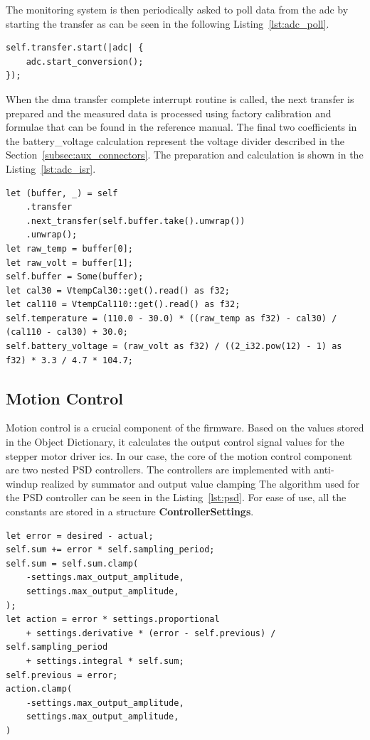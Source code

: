 The monitoring system is then periodically asked to poll data from the \acs{adc} by starting the transfer as can be seen in the following Listing~\ref{lst:adc_poll}.
\begin{lstlisting}[caption={Polling the ADC.},label=lst:adc_poll]
self.transfer.start(|adc| {
    adc.start_conversion();
});
\end{lstlisting}
When the \acs{dma} transfer complete interrupt routine is called, the next transfer is prepared and the measured data is processed using factory calibration and formulae that can be found in the reference manual\cite{stmicro_stm32f405xx_2020}.
The final two coefficients in the battery\_voltage calculation represent the voltage divider described in the Section~\ref{subsec:aux_connectors}.
The preparation and calculation is shown in the Listing~\ref{lst:adc_isr}.
\begin{lstlisting}[caption={Processing the data measured by the ADC.},label=lst:adc_isr]
let (buffer, _) = self
    .transfer
    .next_transfer(self.buffer.take().unwrap())
    .unwrap();
let raw_temp = buffer[0];
let raw_volt = buffer[1];
self.buffer = Some(buffer);
let cal30 = VtempCal30::get().read() as f32;
let cal110 = VtempCal110::get().read() as f32;
self.temperature = (110.0 - 30.0) * ((raw_temp as f32) - cal30) / (cal110 - cal30) + 30.0;
self.battery_voltage = (raw_volt as f32) / ((2_i32.pow(12) - 1) as f32) * 3.3 / 4.7 * 104.7;
\end{lstlisting}

\subsection{Motion Control}
\label{subsec:motion_control}
Motion control is a crucial component of the firmware.
Based on the values stored in the Object Dictionary, it calculates the output control signal values for the stepper motor driver \acs{ic}s.
In our case, the core of the motion control component are two nested PSD controllers.
The controllers are implemented with anti-windup realized by summator and output value clamping
The algorithm used for the PSD controller can be seen in the Listing~\ref{lst:psd}.
For ease of use, all the constants are stored in a structure \textbf{ControllerSettings}.
\begin{lstlisting}[caption={Implementation of the PSD controller with integrator.},label=lst:psd]
let error = desired - actual;
self.sum += error * self.sampling_period;
self.sum = self.sum.clamp(
    -settings.max_output_amplitude,
    settings.max_output_amplitude,
);
let action = error * settings.proportional
    + settings.derivative * (error - self.previous) / self.sampling_period
    + settings.integral * self.sum;
self.previous = error;
action.clamp(
    -settings.max_output_amplitude,
    settings.max_output_amplitude,
)
\end{lstlisting}

